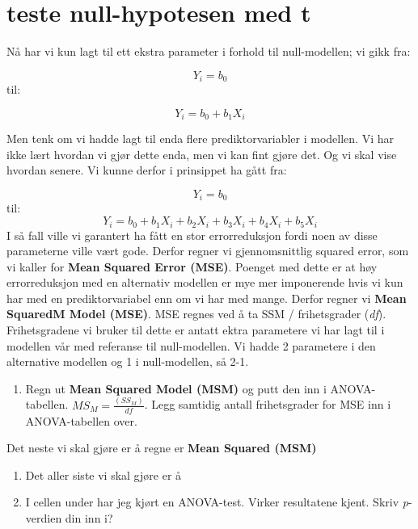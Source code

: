 \documentclass[
]{book}
\providecommand{\tightlist}{%
  \setlength{\itemsep}{0pt}\setlength{\parskip}{0pt}}
\begin{document}
\hypertarget{teste-null-hypotesen-med-t}{%
\section{teste null-hypotesen med t}\label{teste-null-hypotesen-med-t}}

Nå har vi kun lagt til ett ekstra parameter i forhold til null-modellen; vi gikk fra:

\[
Y_i = b_0
\]
til:

\[
Y_i = b_0 + b_1X_i
\]

Men tenk om vi hadde lagt til enda flere prediktorvariabler i modellen. Vi har ikke lært hvordan vi gjør dette enda, men vi kan fint gjøre det. Og vi skal vise hvordan senere. Vi kunne derfor i prinsippet ha gått fra:

\[
Y_i = b_0
\]
til:
\[
Y_i  = b_0 + b_1X_i + b_2X_i + b_3X_i + b_4X_i + b_5X_i
\]
I så fall ville vi garantert ha fått en stor errorreduksjon fordi noen av disse parameterne ville vært gode. Derfor regner vi gjennomsnittlig squared error, som vi kaller for \textbf{Mean Squared Error (MSE)}. Poenget med dette er at høy errorreduksjon med en alternativ modellen er mye mer imponerende hvis vi kun har med en prediktorvariabel enn om vi har med mange. Derfor regner vi \textbf{Mean SquaredM Model (MSE)}. MSE regnes ved å ta SSM / frihetsgrader (\emph{df}). Frihetsgradene vi bruker til dette er antatt ektra parametere vi har lagt til i modellen vår med referanse til null-modellen. Vi hadde 2 parametere i den alternative modellen og 1 i null-modellen, så 2-1.

\begin{enumerate}
\def\labelenumi{\alph{enumi}.}
\setcounter{enumi}{5}
\tightlist
\item
  Regn ut \textbf{Mean Squared Model (MSM)} og putt den inn i ANOVA-tabellen. \(MS_M=\frac{(SS_M)}{df}\). Legg samtidig antall frihetsgrader for MSE inn i ANOVA-tabellen over.
\end{enumerate}

Det neste vi skal gjøre er å regne er \textbf{Mean Squared (MSM)}

\begin{enumerate}
\def\labelenumi{\alph{enumi}.}
\setcounter{enumi}{6}
\item
  Det aller siste vi skal gjøre er å
\item
  I cellen under har jeg kjørt en ANOVA-test. Virker resultatene kjent. Skriv \emph{p}-verdien din inn i?
\end{enumerate}
\end{document}
